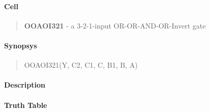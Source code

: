 \label{OOAOI321}
\paragraph{Cell}
\begin{quote}
    \textbf{OOAOI321} - a 3-2-1-input OR-OR-AND-OR-Invert gate
\end{quote}

\paragraph{Synopsys}
\begin{quote}
    OOAOI321(Y, C2, C1, C, B1, B, A)
\end{quote}

\paragraph{Description}

%

\paragraph{Truth Table}
%

